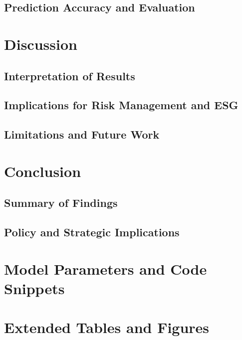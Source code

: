 \documentclass[12pt]{report}
\begin{document}
\section{Prediction Accuracy and Evaluation}

\chapter{Discussion}
\section{Interpretation of Results}
\section{Implications for Risk Management and ESG}
\section{Limitations and Future Work}

\chapter{Conclusion}
\section{Summary of Findings}
\section{Policy and Strategic Implications}

\appendix
\chapter{Model Parameters and Code Snippets}
\chapter{Extended Tables and Figures}



\end{document}
